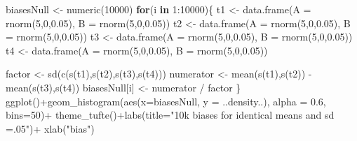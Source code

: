 \documentclass[
  10pt,
  dvipsnames,enabledeprecatedfontcommands]{scrartcl}
\newenvironment{Shaded}{\begin{snugshade}}{\end{snugshade}}
\newcommand{\AttributeTok}[1]{\textcolor[rgb]{0.77,0.63,0.00}{#1}}
\newcommand{\ControlFlowTok}[1]{\textcolor[rgb]{0.13,0.29,0.53}{\textbf{#1}}}
\newcommand{\DecValTok}[1]{\textcolor[rgb]{0.00,0.00,0.81}{#1}}
\newcommand{\FloatTok}[1]{\textcolor[rgb]{0.00,0.00,0.81}{#1}}
\newcommand{\FunctionTok}[1]{\textcolor[rgb]{0.00,0.00,0.00}{#1}}
\newcommand{\NormalTok}[1]{#1}
\newcommand{\OtherTok}[1]{\textcolor[rgb]{0.56,0.35,0.01}{#1}}
\newcommand{\SpecialCharTok}[1]{\textcolor[rgb]{0.00,0.00,0.00}{#1}}
\newcommand{\StringTok}[1]{\textcolor[rgb]{0.31,0.60,0.02}{#1}}
\begin{document}
\begin{Shaded}
\begin{Highlighting}[]
\NormalTok{biasesNull }\OtherTok{\textless{}{-}} \FunctionTok{numeric}\NormalTok{(}\DecValTok{10000}\NormalTok{)}
\ControlFlowTok{for}\NormalTok{(i }\ControlFlowTok{in} \DecValTok{1}\SpecialCharTok{:}\DecValTok{10000}\NormalTok{)\{}
\NormalTok{t1 }\OtherTok{\textless{}{-}} \FunctionTok{data.frame}\NormalTok{(}\AttributeTok{A  =} \FunctionTok{rnorm}\NormalTok{(}\DecValTok{5}\NormalTok{,}\DecValTok{0}\NormalTok{,}\FloatTok{0.05}\NormalTok{), }\AttributeTok{B =} \FunctionTok{rnorm}\NormalTok{(}\DecValTok{5}\NormalTok{,}\DecValTok{0}\NormalTok{,}\FloatTok{0.05}\NormalTok{))}
\NormalTok{t2 }\OtherTok{\textless{}{-}} \FunctionTok{data.frame}\NormalTok{(}\AttributeTok{A  =} \FunctionTok{rnorm}\NormalTok{(}\DecValTok{5}\NormalTok{,}\DecValTok{0}\NormalTok{,}\FloatTok{0.05}\NormalTok{), }\AttributeTok{B =} \FunctionTok{rnorm}\NormalTok{(}\DecValTok{5}\NormalTok{,}\DecValTok{0}\NormalTok{,}\FloatTok{0.05}\NormalTok{))}
\NormalTok{t3 }\OtherTok{\textless{}{-}} \FunctionTok{data.frame}\NormalTok{(}\AttributeTok{A  =} \FunctionTok{rnorm}\NormalTok{(}\DecValTok{5}\NormalTok{,}\DecValTok{0}\NormalTok{,}\FloatTok{0.05}\NormalTok{), }\AttributeTok{B =} \FunctionTok{rnorm}\NormalTok{(}\DecValTok{5}\NormalTok{,}\DecValTok{0}\NormalTok{,}\FloatTok{0.05}\NormalTok{))}
\NormalTok{t4 }\OtherTok{\textless{}{-}} \FunctionTok{data.frame}\NormalTok{(}\AttributeTok{A  =} \FunctionTok{rnorm}\NormalTok{(}\DecValTok{5}\NormalTok{,}\DecValTok{0}\NormalTok{,}\FloatTok{0.05}\NormalTok{), }\AttributeTok{B =} \FunctionTok{rnorm}\NormalTok{(}\DecValTok{5}\NormalTok{,}\DecValTok{0}\NormalTok{,}\FloatTok{0.05}\NormalTok{))}

\NormalTok{factor }\OtherTok{\textless{}{-}} \FunctionTok{sd}\NormalTok{(}\FunctionTok{c}\NormalTok{(}\FunctionTok{s}\NormalTok{(t1),}\FunctionTok{s}\NormalTok{(t2),}\FunctionTok{s}\NormalTok{(t3),}\FunctionTok{s}\NormalTok{(t4)))}
\NormalTok{numerator }\OtherTok{\textless{}{-}}  \FunctionTok{mean}\NormalTok{(}\FunctionTok{s}\NormalTok{(t1),}\FunctionTok{s}\NormalTok{(t2)) }\SpecialCharTok{{-}} \FunctionTok{mean}\NormalTok{(}\FunctionTok{s}\NormalTok{(t3),}\FunctionTok{s}\NormalTok{(t4))}
\NormalTok{biasesNull[i]  }\OtherTok{\textless{}{-}}\NormalTok{ numerator }\SpecialCharTok{/}\NormalTok{ factor}
\NormalTok{\}}
\FunctionTok{ggplot}\NormalTok{()}\SpecialCharTok{+}\FunctionTok{geom\_histogram}\NormalTok{(}\FunctionTok{aes}\NormalTok{(}\AttributeTok{x=}\NormalTok{biasesNull, }\AttributeTok{y =}\NormalTok{ ..density..), }\AttributeTok{alpha =} \FloatTok{0.6}\NormalTok{, }\AttributeTok{bins=}\DecValTok{50}\NormalTok{)}\SpecialCharTok{+}
  \FunctionTok{theme\_tufte}\NormalTok{()}\SpecialCharTok{+}\FunctionTok{labs}\NormalTok{(}\AttributeTok{title=}\StringTok{"10k biases for identical means and sd =.05"}\NormalTok{)}\SpecialCharTok{+} \FunctionTok{xlab}\NormalTok{(}\StringTok{"bias"}\NormalTok{)}
\end{Highlighting}
\end{Shaded}
\end{document}

